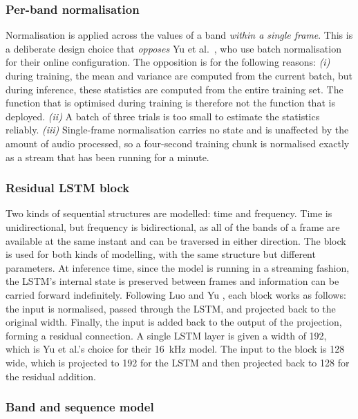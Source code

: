 \subsubsection{Per-band normalisation}
\label{sec:subbandnorm}

 Normalisation is applied across the values of a band \emph{within a single frame}. This is a deliberate design choice that \emph{opposes} Yu et al.\ \cite{yu2023high}, who use batch normalisation for their online configuration. The opposition is for the following reasons: \textit{(i)} during training, the mean and variance are computed from the current batch, but during inference, these statistics are computed from the entire training set. The function that is optimised during training is therefore not the function that is deployed. \textit{(ii)} A batch of three trials is too small to estimate the statistics reliably. \textit{(iii)} Single-frame normalisation carries no state and is unaffected by the amount of audio processed, so a four-second training chunk is normalised exactly as a stream that has been running for a minute.

 \subsubsection{Residual LSTM block}
\label{sec:resrnn}

Two kinds of sequential structures are modelled: time and frequency. Time is unidirectional, but frequency is bidirectional, as all of the bands of a frame are available at the same instant and can be traversed in either direction. The block is used for both kinds of modelling, with the same structure but different parameters. At inference time, since the model is running in a streaming fashion, the LSTM's internal state is preserved between frames and information can be carried forward indefinitely. Following Luo and Yu \cite{luo2023music}, each block works as follows: the input is normalised, passed through the LSTM, and projected back to the original width. Finally, the input is added back to the output of the projection, forming a residual connection. A single LSTM layer is given a width of 192, which is Yu et al.'s \cite{yu2023high} choice for their \SI{16}{\kHz} model. The input to the block is 128 wide, which is projected to 192 for the LSTM and then projected back to 128 for the residual addition. 

\subsubsection{Band and sequence model}
\label{sec:bsnet}

